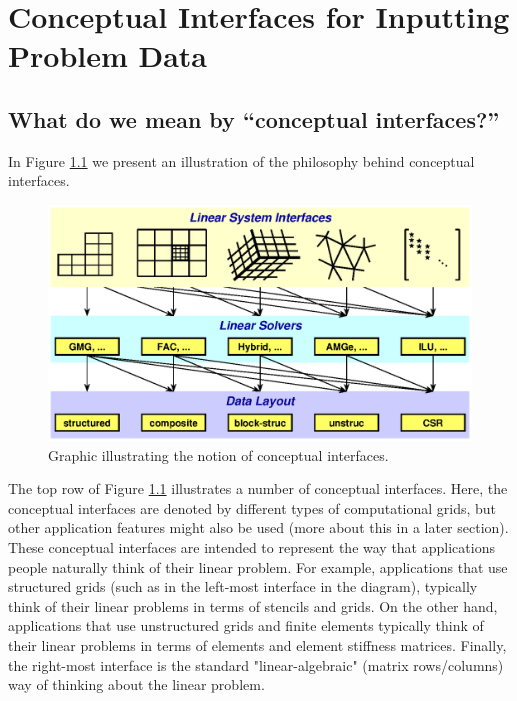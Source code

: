 \chapter{Conceptual Interfaces for Inputting Problem Data}
\label{Conceptual Interfaces}

\section{What do we mean by ``conceptual interfaces?''}

In Figure \ref{fig-conceptual-interface} we present an illustration
of the philosophy behind conceptual interfaces.


\begin{figure}
\centering
\includegraphics[width=5in]{concep_iface.eps}
\caption{%
Graphic illustrating the notion of conceptual interfaces.}
\label{fig-conceptual-interface}
\end{figure}

The top row of Figure \ref{fig-conceptual-interface} 
illustrates a number of conceptual interfaces.  Here,
the conceptual interfaces are denoted by different types of computational
grids,  but other application features might also be used (more about this  in
a later section).  These conceptual interfaces are intended to represent the
way that applications people naturally think of their linear problem.  For
example, applications that use structured grids (such as in the left-most
interface in the diagram), typically think of their linear problems in terms of
stencils and grids.  On the other hand, applications that use unstructured
grids and finite elements typically think of their linear problems in terms of
elements and element stiffness matrices.  Finally, the right-most interface is
the standard "linear-algebraic" (matrix rows/columns) way of thinking about the
linear problem.

